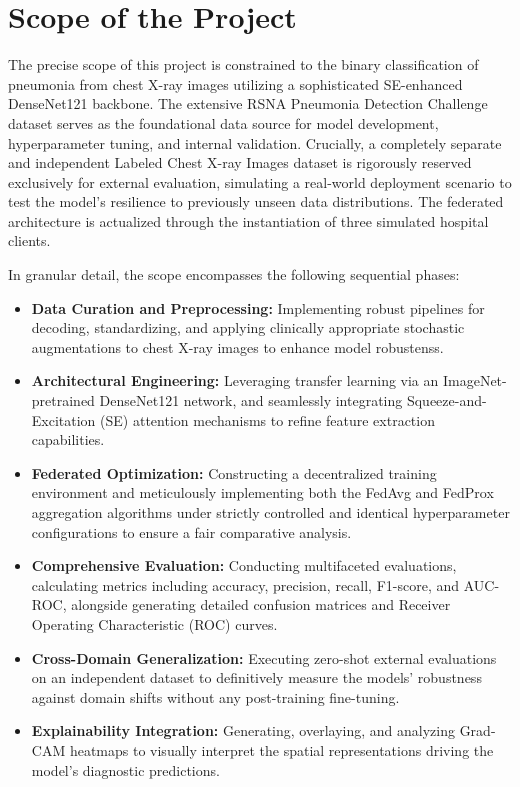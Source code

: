 \documentclass[12pt,a4paper]{report}
\begin{document}
\section{Scope of the Project}

The precise scope of this project is constrained to the binary classification of pneumonia from chest X-ray images utilizing a sophisticated SE-enhanced DenseNet121 backbone. The extensive RSNA Pneumonia Detection Challenge dataset serves as the foundational data source for model development, hyperparameter tuning, and internal validation. Crucially, a completely separate and independent Labeled Chest X-ray Images dataset is rigorously reserved exclusively for external evaluation, simulating a real-world deployment scenario to test the model's resilience to previously unseen data distributions. The federated architecture is actualized through the instantiation of three simulated hospital clients.

In granular detail, the scope encompasses the following sequential phases:
\begin{itemize}
    \item \textbf{Data Curation and Preprocessing:} Implementing robust pipelines for decoding, standardizing, and applying clinically appropriate stochastic augmentations to chest X-ray images to enhance model robustenss.
    \item \textbf{Architectural Engineering:} Leveraging transfer learning via an ImageNet-pretrained DenseNet121 network, and seamlessly integrating Squeeze-and-Excitation (SE) attention mechanisms to refine feature extraction capabilities.
    \item \textbf{Federated Optimization:} Constructing a decentralized training environment and meticulously implementing both the FedAvg and FedProx aggregation algorithms under strictly controlled and identical hyperparameter configurations to ensure a fair comparative analysis.
    \item \textbf{Comprehensive Evaluation:} Conducting multifaceted evaluations, calculating metrics including accuracy, precision, recall, F1-score, and AUC-ROC, alongside generating detailed confusion matrices and Receiver Operating Characteristic (ROC) curves.
    \item \textbf{Cross-Domain Generalization:} Executing zero-shot external evaluations on an independent dataset to definitively measure the models' robustness against domain shifts without any post-training fine-tuning.
    \item \textbf{Explainability Integration:} Generating, overlaying, and analyzing Grad-CAM heatmaps to visually interpret the spatial representations driving the model's diagnostic predictions.
\end{itemize}
\end{document}

